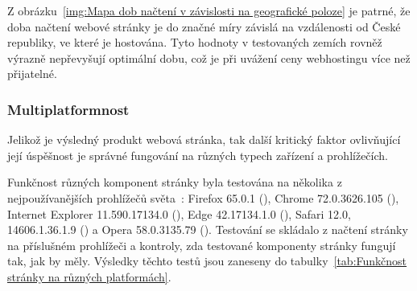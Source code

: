 \documentclass[a4paper, 12pt]{article}
\begin{document}
  Z obrázku~\ref{img:Mapa dob načtení v závislosti na geografické poloze} je patrné, že doba načtení webové stránky je do značné míry závislá na vzdálenosti od České republiky, ve které je hostována. Tyto hodnoty v testovaných zemích rovněž výrazně nepřevyšují optimální dobu, což je při uvážení ceny webhostingu více než přijatelné.


  \subsubsection{Multiplatformnost}
  Jelikož je výsledný produkt webová stránka, tak další kritický faktor ovlivňující její úspěšnost je správné fungování na různých typech zařízení a prohlížečích.

  Funkčnost různých komponent stránky byla testována na několika z nejpoužívanějších prohlížečů světa~\cite{browser-statistics}: Firefox 65.0.1 (), Chrome 72.0.3626.105 (), Internet Explorer 11.590.17134.0 (), Edge 42.17134.1.0 (), Safari 12.0, 14606.1.36.1.9 () a Opera 58.0.3135.79 (). Testování se skládalo z načtení stránky na příslušném prohlížeči a kontroly, zda testované komponenty stránky fungují tak, jak by měly. Výsledky těchto testů jsou zaneseny do tabulky~\ref{tab:Funkčnost stránky na různých platformách}.
\end{document}
